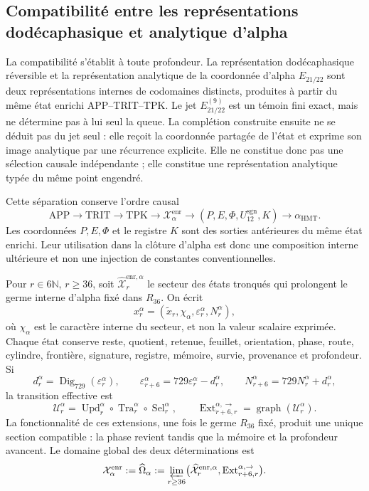 \subsection{Compatibilité entre les représentations dodécaphasique et analytique d'alpha}
\label{subsec:alpha-limite-dos-vias}

La compatibilité s'établit à toute profondeur. La représentation
dodécaphasique réversible et la représentation analytique de la
coordonnée d'alpha
\(E_{21/22}\) sont deux représentations internes de codomaines distincts,
produites à partir du même état enrichi APP--TRIT--TPK. Le jet
\(E_{21/22}^{(9)}\) est un témoin fini exact, mais ne détermine pas à lui seul
la queue. La complétion construite ensuite ne se déduit pas du jet
seul : elle reçoit la coordonnée partagée de l'état et exprime son image
analytique par une récurrence explicite. Elle ne constitue donc pas une
sélection causale indépendante ; elle constitue une représentation analytique
typée du même point engendré.

Cette séparation conserve l'ordre causal
\[
 \mathrm{APP}\longrightarrow\mathrm{TRIT}\longrightarrow\mathrm{TPK}
 \longrightarrow\mathcal X_{\alpha}^{\mathrm{enr}}
 \longrightarrow (P,E,\Phi,U_{12}^{\mathrm{sgn}},K)
 \longrightarrow\alpha_{\mathrm{HMT}}.
\]
Les coordonnées \(P,E,\Phi\) et le registre \(K\) sont des sorties antérieures du
même état enrichi. Leur utilisation dans la clôture d'alpha est donc une
composition interne ultérieure et non une injection de constantes
conventionnelles.

Pour \(r\in6\mathbb N\), \(r\ge36\), soit
\(\widehat{\mathcal X}^{\mathrm{enr},\alpha}_r\) le secteur des états
tronqués qui prolongent le germe interne d'alpha fixé dans \(R_{36}\). On
écrit
\[
 x_r^\alpha=(\widetilde x_r,\chi_\alpha,
              \varepsilon_r^\alpha,N_r^\alpha),
\]
où \(\chi_\alpha\) est le caractère interne du secteur, et non la valeur scalaire
exprimée. Chaque état conserve reste, quotient, retenue, feuillet, orientation,
phase, route, cylindre, frontière, signature, registre, mémoire, survie,
provenance et profondeur. Si
\[
 d_r^\alpha=\operatorname{Dig}_{729}(\varepsilon_r^\alpha),\qquad
 \varepsilon_{r+6}^\alpha=729\varepsilon_r^\alpha-d_r^\alpha,
 \qquad N_{r+6}^\alpha=729N_r^\alpha+d_r^\alpha,
\]
la transition effective est
\[
 \mathcal U_r^\alpha=
 \operatorname{Upd}_r^\alpha\circ
 \operatorname{Tra}_r^\alpha\circ
 \operatorname{Sel}_r^\alpha,
 \qquad
 \operatorname{Ext}^{\alpha,\to}_{r+6,r}
 =\operatorname{graph}(\mathcal U_r^\alpha).
\]
La fonctionnalité de ces extensions, une fois le germe \(R_{36}\) fixé,
produit une unique section compatible : la phase revient tandis que la mémoire et
la profondeur avancent. Le domaine global des deux déterminations est
\begin{equation}
 \mathcal X_\alpha^{\mathrm{enr}}:=\widehat\Omega_\alpha
 :=\varprojlim_{r\ge36}
 \bigl(\widehat{\mathcal X}^{\mathrm{enr},\alpha}_r,
       \operatorname{Ext}^{\alpha,\to}_{r+6,r}\bigr).
 \label{eq:alpha-dominio-enriquecido-completo}
\end{equation}

